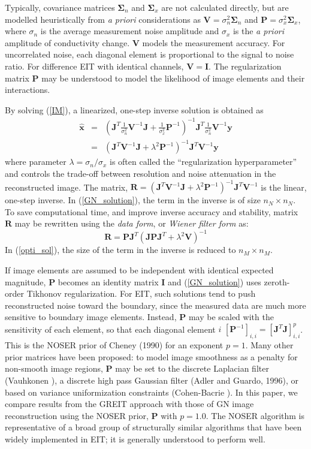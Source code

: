 \documentclass[12pt]{iopart}
\newcommand{\xH}{\mbox{$\mathbf{\hat x}$}}
\newcommand{\yB}{\mbox{$\mathbf{y}$}}
\newcommand{\RB}{\mbox{$\mathbf{R}$}}
\newcommand{\IB}{\mbox{$\mathbf{I}$}}
\newcommand{\JB}{\mbox{$\mathbf{J}$}}
\renewcommand{\PB}{\mbox{$\mathbf{P}$}}
\newcommand{\VB}{\mbox{$\mathbf{V}$}}
\newcommand{\SG}{\mbox{${\boldsymbol \Sigma}$}}
\begin{document}
Typically,  covariance matrices
$\SG_n$ and $\SG_x$ are not calculated directly, but
are modelled heuristically from {\em a priori}
considerations as 
 $\VB = \sigma_n^{2}\SG_n$
 and
 $\PB = \sigma_x^{2}\SG_x$,
where $\sigma_n$ is the average measurement noise amplitude and
$\sigma_x$ is the {\em a priori} amplitude of conductivity change.
$\VB$ models the measurement accuracy. For uncorrelated noise,
each diagonal element is proportional to the signal to noise
ratio. For difference EIT with identical channels, $\VB=\IB$. The
regularization matrix $\PB$ may be understood to model the
likelihood of image elements and their interactions.

By solving (\ref{IM}), a linearized, one-step inverse solution is
obtained as
\begin{eqnarray}\label{GN_solution}
\xH&=&\left(
    \JB^T \frac{1}{\sigma_n^2} \VB^{-1} \JB 
     +
    \frac{1}{\sigma_x^2} \PB^{-1}
    \right)^{-1}
    \JB^T \frac{1}{\sigma_n^2}\VB^{-1}\yB
\nonumber \\
   &=&\left(
    \JB^T \VB^{-1} \JB + \lambda^2 \PB^{-1}
    \right)^{-1}
    \JB^T \VB^{-1} \yB
\end{eqnarray}
where parameter  $\lambda=\sigma_n/\sigma_x$ is
often called the ``regularization hyperparameter'' and
controls the trade-off
between resolution and noise attenuation in the reconstructed
image.
The matrix,
$\RB=\left(\JB^T\VB^{-1}\JB+\lambda^2\PB^{-1}\right)^{-1}\JB^T\VB^{-1}$
is the linear, one-step inverse.
In (\ref{GN_solution}), the term in the inverse is of size
$n_N\times n_N$. To save computational time, and improve inverse
accuracy and stability, matrix $\RB$ may be rewritten 
using the {\em data form}, or {\em Wiener filter form} as:
\begin{equation}\label{opti_sol}
 \RB =\PB\JB^T
    \left(
       \JB\PB\JB^T+\lambda^2\VB
   \right)^{-1}
\end{equation}
In (\ref{opti_sol}), the size of the term in the
inverse is reduced to $n_M\times n_M$.

If image elements are assumed to be independent with identical
expected magnitude, $\PB$ becomes an identity matrix $\IB$ and
(\ref{GN_solution}) uses zeroth-order Tikhonov regularization. For
EIT, such solutions tend to push reconstructed noise toward the
boundary, since the measured data are much more sensitive to
boundary image elements. Instead, $\PB$ may be scaled with the
sensitivity of each element, so that each diagonal element $i$ 
$[\PB^{-1}]_{i,i} = \left[ \JB^T \JB
\right]_{i,i}^p$. This is the NOSER prior of Cheney \etal (1990)
for an exponent $p=1$. Many other prior matrices have been
proposed: to model image smoothness as a penalty for non-smooth
image regions, $\PB$ may be set to the discrete Laplacian filter
(Vauhkonen ), a discrete high pass Gaussian filter (Adler
and Guardo, 1996), or based on variance uniformization
constraints (Cohen-Bacrie ).
In this paper, we compare results from the GREIT approach
with those of GN image reconstruction using the NOSER prior,
$\PB$ with $p=1.0$.  The NOSER algorithm is 
representative of a broad group of structurally similar 
algorithms that have been widely implemented in EIT;
it is generally understood to perform well.
\end{document}
